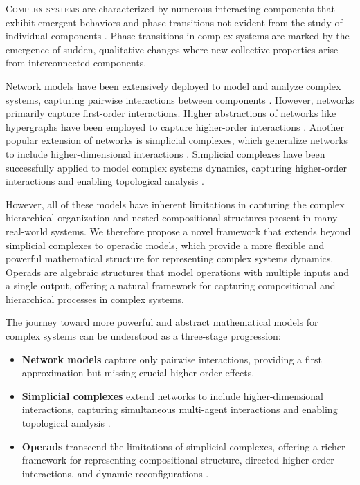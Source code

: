 \lettrine[lines=2, findent=3pt, nindent=0pt]{C}{omplex systems} are characterized by numerous interacting components that exhibit emergent behaviors and phase transitions not evident from the study of individual components \citep{mitchell2009complexity}. Phase transitions in complex systems are marked by the emergence of sudden, qualitative changes where new collective properties arise from interconnected components.

Network models have been extensively deployed to model and analyze complex systems, capturing pairwise interactions between components \citep{newman2003structure, boccaletti2006complex}. However, networks primarily capture first-order interactions. Higher abstractions of networks like hypergraphs have been employed to capture higher-order interactions \citep{battiston2020networks}. Another popular extension of networks is simplicial complexes, which generalize networks to include higher-dimensional interactions \citep{petri2014homological}. Simplicial complexes have been successfully applied to model complex systems dynamics, capturing higher-order interactions and enabling topological analysis \citep{petri2014homological, giusti2016two, sizemore2018importance}.

However, all of these models have inherent limitations in capturing the complex hierarchical organization and nested compositional structures present in many real-world systems. We therefore propose a novel framework that extends beyond simplicial complexes to operadic models, which provide a more flexible and powerful mathematical structure for representing complex systems dynamics. Operads are algebraic structures that model operations with multiple inputs and a single output, offering a natural framework for capturing compositional and hierarchical processes in complex systems.

The journey toward more powerful and abstract mathematical models for complex systems can be understood as a three-stage progression:

\begin{itemize}[leftmargin=*]
  \item \textbf{Network models} capture only pairwise interactions, providing a first approximation but missing crucial higher-order effects.

  \item \textbf{Simplicial complexes} extend networks to include higher-dimensional interactions, capturing simultaneous multi-agent interactions and enabling topological analysis \citep{battiston2020networks, petri2014homological}.

  \item \textbf{Operads} transcend the limitations of simplicial complexes, offering a richer framework for representing compositional structure, directed higher-order interactions, and dynamic reconfigurations \citep{baez2020network, leinster2004higher, behr2021operad}.
\end{itemize}

